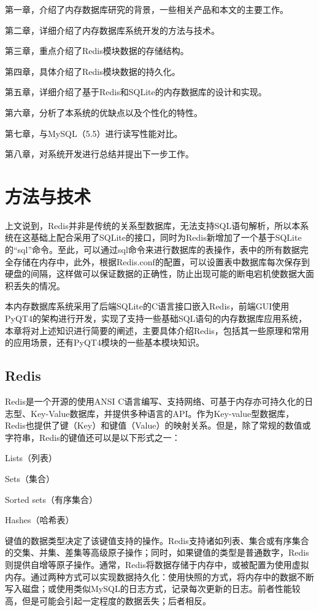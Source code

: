 \documentclass{zjutthesis}
\begin{document}
第一章，介绍了内存数据库研究的背景，一些相关产品和本文的主要工作。

第二章，详细介绍了内存数据库系统开发的方法与技术。

第三章，重点介绍了Redis模块数据的存储结构。

第四章，具体介绍了Redis模块数据的持久化。

第五章，详细介绍了基于Redis和SQLite的内存数据库的设计和实现。

第六章，分析了本系统的优缺点以及个性化的特性。

第七章，与MySQL（5.5）进行读写性能对比。

第八章，对系统开发进行总结并提出下一步工作。


\chapter{方法与技术}
上文说到，Redis并非是传统的关系型数据库，无法支持SQL语句解析，所以本系统在这基础上配合采用了SQLite的接口，同时为Redis新增加了一个基于SQLite的“sql”命令。至此，可以通过sql命令来进行数据库的表操作，表中的所有数据完全存储在内存中，此外，根据Redis.conf的配置，可以设置表中数据库每次保存到硬盘的间隔，这样做可以保证数据的正确性，防止出现可能的断电宕机使数据大面积丢失的情况。

本内存数据库系统采用了后端SQLite的C语言接口嵌入Redis，前端GUI使用PyQT4的架构进行开发，实现了支持一些基础SQL语句的内存数据库应用系统，本章将对上述知识进行简要的阐述，主要具体介绍Redis，包括其一些原理和常用的应用场景，还有PyQT4模块的一些基本模块知识。

\section{Redis}
Redis是一个开源的使用ANSI C语言编写、支持网络、可基于内存亦可持久化的日志型、Key-Value数据库，并提供多种语言的API。作为Key-value型数据库，Redis也提供了键（Key）和键值（Value）的映射关系。但是，除了常规的数值或字符串，Redis的键值还可以是以下形式之一：

Lists（列表）

Sets（集合）

Sorted sets（有序集合）

Hashes（哈希表）

键值的数据类型决定了该键值支持的操作。Redis支持诸如列表、集合或有序集合的交集、并集、差集等高级原子操作；同时，如果键值的类型是普通数字，Redis则提供自增等原子操作。通常，Redis将数据存储于内存中，或被配置为使用虚拟内存。通过两种方式可以实现数据持久化：使用快照的方式，将内存中的数据不断写入磁盘；或使用类似MySQL的日志方式\cite{ref:12}，记录每次更新的日志。前者性能较高，但是可能会引起一定程度的数据丢失；后者相反。
\end{document}
